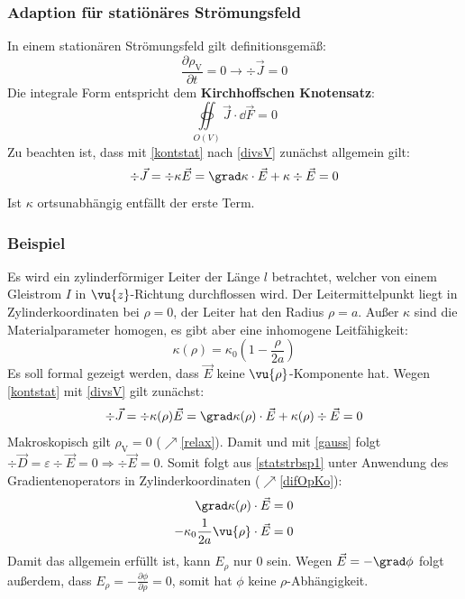 		          \subsubsection{Adaption für statiönäres Strömungsfeld}
		   In einem stationären Strömungsfeld gilt definitionsgemäß:
		        \begin{equation}\label{kontstat}
			        \dfrac{\partial \rho_\text{V}}{\partial t} = 0 \to \boxed{\div \vec{J} = 0}
		        \end{equation}
		   Die integrale Form entspricht dem \textbf{Kirchhoffschen Knotensatz}:
		        \begin{equation}
			        \oiint\limits_{O(V)} \vec{J} \cdot \dd{}{\vec{F}} = 0
		        \end{equation}
		        Zu beachten ist, dass mit \ref{kontstat} nach \ref{divsV} zunächst allgemein gilt:
		        \begin{equation}
		        	\div \vec{J}= \div \kappa \vec{E} = \grad \kappa \cdot\vec{E} + \kappa\div \vec{E} = 0
		        \end{equation}
		        Ist $\kappa$ ortsunabhängig entfällt der erste Term.
		         \subsubsection{Beispiel}
		        Es wird ein zylinderförmiger Leiter der Länge $l$ betrachtet, welcher von einem Gleistrom $I$ in $\vu{z}$-Richtung durchflossen wird. Der Leitermittelpunkt liegt in Zylinderkoordinaten bei $\rho=0$, der Leiter hat den Radius $\rho=a$. Außer $\kappa$ sind die Materialparameter homogen, es gibt aber eine inhomogene Leitfähigkeit:
		        \begin{equation}
		        	\kappa(\rho)=\kappa_0\left(1-\frac{\rho}{2a}\right)
		        \end{equation}
		        Es soll formal gezeigt werden, dass $\vec{{E}}$ keine $\vu{\rho}$-Komponente hat. Wegen \ref{kontstat} mit \ref{divsV} gilt zunächst:
		        \begin{equation}\label{statstrbsp1}
		        	\div \vec{J}= \div \kappa(\rho) \vec{E} = \grad \kappa(\rho) \cdot\vec{E} + \kappa(\rho)\div \vec{E} = 0
		        \end{equation}
		        Makroskopisch gilt $\rho_\text{V}=0$ ($\nearrow$\ref{relax}). Damit und mit \ref{gauss} folgt $\div\vec{D}=\varepsilon\div\vec{E}=0\Rightarrow\div\vec{E}=0$. Somit folgt aus \ref{statstrbsp1} unter Anwendung des Gradientenoperators in Zylinderkoordinaten ($\nearrow$\ref{difOpKo}):
		        \begin{equation}\begin{split}
		        	\grad \kappa( \rho) \cdot\vec{E} &= 0\\
		        	-\kappa_0\frac{1}{2a}\vu{\rho} \cdot\vec{E} &= 0
	\end{split}\end{equation}
Damit das allgemein erfüllt ist, kann $E_\rho$ nur 0 sein. Wegen $\vec{E}=-\grad\phi$ folgt außerdem, dass $E_\rho=-\frac{\partial \phi}{\partial \rho}=0$, somit hat $\phi$ keine $\rho$-Abhängigkeit.
